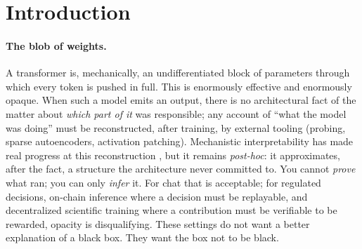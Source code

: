 \documentclass[11pt]{article}
\begin{document}
\begin{abstract}
training budget, attaining lower loss is a parameter- and compute-efficiency advantage---the same
capability is reachable with less of both---which is what we mean when we say partitioning lets a
model \emph{learn more per parameter} than its dense twin; we measure capability per parameter, not
wall-clock, and keep that distinction explicit. A learned router generalizes to held-out prompts
(separation 3.10 vs.\ 2.63). \textbf{Decentralizability} is specified, formally modeled, and now
partially scaffolded---a signed, verify-before-compose zone gather---with the multi-node training
cycle still future work: composable named zones reconciled via paraconsistent (Belnap) aggregation
on a verifiable chain. All empirical results are at small scale ($\le$2M parameters, byte- and
subword-level), without a mixture-of-experts baseline or component ablation, and we are explicit
that a larger, better-controlled run could flatten or reverse the trend. NAT is
implemented as a reproducible Rust workspace; a GGUF/ONNX sidecar design targets ecosystem
compatibility. We position NAT as the model layer for a verifiable, federated learning network in
which \emph{consensus and learning are the same process}, and contributors are rewarded as
$\mathrm{compute}\times\mathrm{data\text{-}quality}$.
\end{abstract}

\section{Introduction}

\paragraph{The blob of weights.}
A transformer \citep{vaswani2017attention} is, mechanically, an undifferentiated block of parameters
through which every token is pushed in full. This is enormously effective and enormously opaque. When such a model emits an
output, there is no architectural fact of the matter about \emph{which part of it} was responsible;
any account of ``what the model was doing'' must be reconstructed, after training, by external
tooling (probing, sparse autoencoders, activation patching). Mechanistic interpretability has made
real progress at this reconstruction \citep{rai2024practical,bereska2024mechanistic}, but it remains
\emph{post-hoc}: it approximates, after the fact, a structure the architecture never committed to.
You cannot \emph{prove} what ran; you can only \emph{infer} it. For chat that is acceptable; for
regulated decisions, on-chain inference where a decision must be replayable, and decentralized
scientific training where a contribution must be verifiable to be rewarded, opacity is
disqualifying. These settings do not want a better explanation of a black box. They want the box not
to be black.
\end{document}
